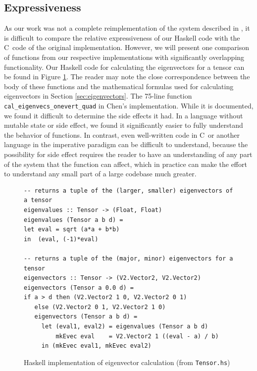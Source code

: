 \documentclass[twocolumn]{article}
\def \cpp {C\nolinebreak[4]\hspace{-.05em}\raisebox{.4ex}{\tiny\bf ++}~}
\begin{document}
\subsection{Expressiveness}
As our work was not a complete reimplementation of the system described in
\cite{chen}, it is difficult to compare the relative expressiveness of our
Haskell code with the \cpp code of the original implementation. However, we
will present one comparison of functions from our respective implementations
with significantly overlapping functionality. Our Haskell code for calculating
the eigenvectors for a tensor can be found in Figure \ref{fig:evecs}. The
reader may note the close correspondence between the body of these functions
and the mathematical formulas used for calculating eigenvectors in Section
\ref{sec:eigenvectors}.  The 75-line function
\texttt{cal\_eigenvecs\_onevert\_quad} in Chen's implementation. While it is
documented, we found it difficult to determine the side effects it had. In a
language without mutable state or side effect, we found it significantly easier
to fully understand the behavior of functions.  In contrast, even well-written
code in \cpp or another language in the imperative paradigm can be difficult to
understand, because the possibility for side effect requires the reader to have
an understanding of any part of the system that the function can affect, which
in practice can make the effort to understand any small part of a large
codebase much greater.

\begin{figure}[t!]
\begin{Verbatim}[frame=single]
-- returns a tuple of the (larger, smaller) eigenvectors of a tensor
eigenvalues :: Tensor -> (Float, Float)
eigenvalues (Tensor a b d) =
let eval = sqrt (a*a + b*b)
in  (eval, (-1)*eval)

-- returns a tuple of the (major, minor) eigenvectors for a tensor
eigenvectors :: Tensor -> (V2.Vector2, V2.Vector2)
eigenvectors (Tensor a 0.0 d) =
if a > d then (V2.Vector2 1 0, V2.Vector2 0 1)
   else (V2.Vector2 0 1, V2.Vector2 1 0)
   eigenvectors (Tensor a b d) =
     let (eval1, eval2) = eigenvalues (Tensor a b d)
         mkEvec eval    = V2.Vector2 1 ((eval - a) / b)
     in (mkEvec eval1, mkEvec eval2)
\end{Verbatim}

\caption{Haskell implementation of eigenvector calculation (from
            \texttt{Tensor.hs})}
\label{fig:evecs}
\end{figure}
\end{document}
